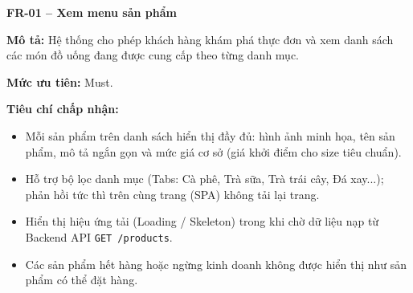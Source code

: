 \documentclass[a4paper]{article}
\begin{document}
\par\ifdim\dimexpr\pagegoal-\pagetotal\relax<6\baselineskip\newpage\fi
{}

\noindent\textbf{FR-01 – Xem menu sản phẩm}\par\nopagebreak
\begin{list}{}{%
    \setlength{\leftmargin}{0.8cm}%
    \setlength{\rightmargin}{0pt}%
    \setlength{\labelwidth}{0pt}%
    \setlength{\labelsep}{0pt}%
    \setlength{\itemindent}{0pt}%
    \setlength{\listparindent}{0pt}%
    \setlength{\itemsep}{5pt}%
    \setlength{\parsep}{0pt}%
    \setlength{\topsep}{5pt}%
}
\item[] \textbf{Mô tả:} Hệ thống cho phép khách hàng khám phá thực đơn và xem danh sách các món đồ uống đang được cung cấp theo từng danh mục.
\item[] \textbf{Mức ưu tiên:} Must.
\item[] \textbf{Tiêu chí chấp nhận:}
\begin{itemize}
    \item Mỗi sản phẩm trên danh sách hiển thị đầy đủ: hình ảnh minh họa, tên sản phẩm, mô tả ngắn gọn và mức giá cơ sở (giá khởi điểm cho size tiêu chuẩn).
    \item Hỗ trợ bộ lọc danh mục (Tabs: Cà phê, Trà sữa, Trà trái cây, Đá xay...); phản hồi tức thì trên cùng trang (SPA) không tải lại trang.
    \item Hiển thị hiệu ứng tải (Loading / Skeleton) trong khi chờ dữ liệu nạp từ Backend API \texttt{GET /products}.
    \item Các sản phẩm hết hàng hoặc ngừng kinh doanh không được hiển thị như sản phẩm có thể đặt hàng.
\end{itemize}
\end{list}

\par\ifdim\dimexpr\pagegoal-\pagetotal\relax<6\baselineskip\newpage\fi
{}
\end{document}
